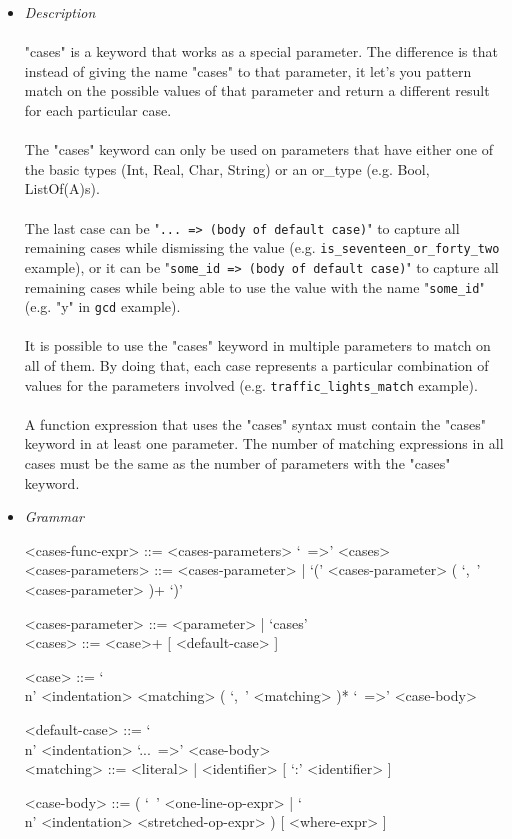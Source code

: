 \documentclass{article}
\begin{document}
\begin{itemize}
\item \textit{Description}\\\\
"cases" is a keyword that works as a special parameter. The difference is that 
instead of giving the name "cases" to that parameter, it let's you 
pattern match on the possible values of that parameter and return a different
result for each particular case. 
\\\\
The "cases" keyword can only be used on parameters that have either one of the 
basic types (Int, Real, Char, String) or an or\_type (e.g. Bool, ListOf(A)s).
\\\\
The last case can be "\texttt{... => (body of default case)}" to capture all
remaining cases while dismissing the value (e.g.
\texttt{is_seventeen_or_forty_two} example), or it can be
"\texttt{some_id => (body of default case)}" to capture all remaining
cases while being able to use the value with the name "\texttt{some_id}"
(e.g.  "y" in \texttt{gcd} example).
\\\\
It is possible to use the "cases" keyword in multiple parameters to match on all
of them. By doing that, each case represents a particular combination of values
for the parameters involved (e.g. \texttt{traffic_lights_match} example).
\\\\
A function expression that uses the "cases" syntax must contain the "cases"
keyword in at least one parameter. The number of matching expressions in 
all cases must be the same as the number of parameters with the "cases" keyword.

\item \textit{Grammar}
\begin{grammar}
<cases-func-expr> ::= <cases-parameters> `\ =>' <cases> \\

<cases-parameters> ::=
<cases-parameter> | `(' <cases-parameter> ( `,\ ' <cases-parameter> )+ `)'

<cases-parameter> ::= <parameter> | `cases'\\

<cases> ::= <case>+ [ <default-case> ]

<case> ::= `\\n' <indentation> <matching> ( `,\ ' <matching> )* `\ =>' <case-body>

<default-case> ::= `\\n' <indentation> `...\ =>' <case-body>\\

<matching> ::= <literal> | <identifier> [ `:' <identifier> ]

<case-body> ::=
( `\ ' <one-line-op-expr> | `\\n' <indentation> <stretched-op-expr> )
[ <where-expr> ]
\end{grammar}

\end{itemize}
\end{document}
